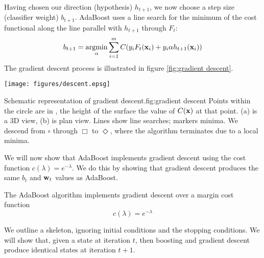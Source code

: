 Having chosen our direction (hypothesis) $h_{t+1}$, we now choose a step
size (classifier weight) $b_{t+1}$.  AdaBoost uses a line search for the
minimum of the cost functional along the line parallel with $h_{t+1}$
through $F_t$:
%
\begin{equation}
b_{t+1} = \argmin_{\alpha} \sum_{i=1}^{m} C(y_i F_t(\bfx_i) + y_i \alpha
h_{t+1}(\bfx_i))
\end{equation}
%
The gradient descent process is illustrated in figure
\ref{fig:gradient descent}.

\begin{linefigure}
\begin{center}
\texttt{[image: figures/descent.epsg]}
\end{center}
\begin{capt}{Schematic representation of gradient
descent.}{fig:gradient descent}
Points within the circle are in \calH, the height of the surface
the value of $C(\mathbf{x})$ at that point.  (a) is a 3D view, (b) is plan
view. Lines show line searches; markers minima.  We descend from
$\circ$ through $\Box$ to $\Diamond$, where the algorithm terminates
due to a local minima.
\end{capt}
\end{linefigure}

We will now show that AdaBoost implements gradient descent using the
cost function $c(\lambda) = e^{-\lambda}$.  We do this by showing that
gradient descent produces the same $b_t$ and $\mathbf{w}_t$ values as
AdaBoost.

\begin{theorem}
\label{thm:adaboost gradient descent}
The AdaBoost algorithm implements gradient descent over a margin cost
function
%
\begin{equation}
\label{eqn:adaboost margin cost function}
c(\lambda) = e^{-\lambda}
\end{equation}
\end{theorem}

\proof We outline a skeleton, ignoring initial conditions and the
stopping conditions.  We will show that, given a state at iteration
$t$, then boosting and gradient descent produce identical states at
iteration $t+1$.

